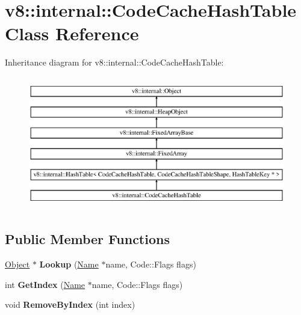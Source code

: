 \hypertarget{classv8_1_1internal_1_1_code_cache_hash_table}{}\section{v8\+:\+:internal\+:\+:Code\+Cache\+Hash\+Table Class Reference}
\label{classv8_1_1internal_1_1_code_cache_hash_table}
Inheritance diagram for v8\+:\+:internal\+:\+:Code\+Cache\+Hash\+Table\+:\begin{figure}[H]
\begin{center}
\leavevmode
\includegraphics[height=5.853658cm]{classv8_1_1internal_1_1_code_cache_hash_table}
\end{center}
\end{figure}
\subsection*{Public Member Functions}
\begin{DoxyCompactItemize}
\item 
\hypertarget{classv8_1_1internal_1_1_code_cache_hash_table_a8ef6843c0b9725d77b24efdcb156057e}{}\hyperlink{classv8_1_1internal_1_1_object}{Object} $\ast$ {\bfseries Lookup} (\hyperlink{classv8_1_1internal_1_1_name}{Name} $\ast$name, Code\+::\+Flags flags)\label{classv8_1_1internal_1_1_code_cache_hash_table_a8ef6843c0b9725d77b24efdcb156057e}

\item 
\hypertarget{classv8_1_1internal_1_1_code_cache_hash_table_a13f648f723f47f5ec4158746378212d0}{}int {\bfseries Get\+Index} (\hyperlink{classv8_1_1internal_1_1_name}{Name} $\ast$name, Code\+::\+Flags flags)\label{classv8_1_1internal_1_1_code_cache_hash_table_a13f648f723f47f5ec4158746378212d0}

\item 
\hypertarget{classv8_1_1internal_1_1_code_cache_hash_table_a83c876a66afc14481cb4b2dc32e8769d}{}void {\bfseries Remove\+By\+Index} (int index)\label{classv8_1_1internal_1_1_code_cache_hash_table_a83c876a66afc14481cb4b2dc32e8769d}

\end{DoxyCompactItemize}
